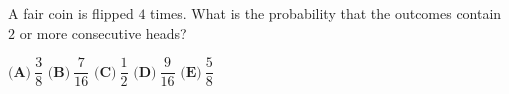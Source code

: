 A fair coin is flipped $4$ times. What is the probability that the outcomes contain $2$ or more consecutive heads?

$\textbf{(A)}\ \dfrac38$ \qquad $\textbf{(B)}\ \dfrac7{16}$ \qquad $\textbf{(C)}\ \dfrac12$ \qquad $\textbf{(D)}\ \dfrac9{16}$ \qquad $\textbf{(E)}\ \dfrac58$
